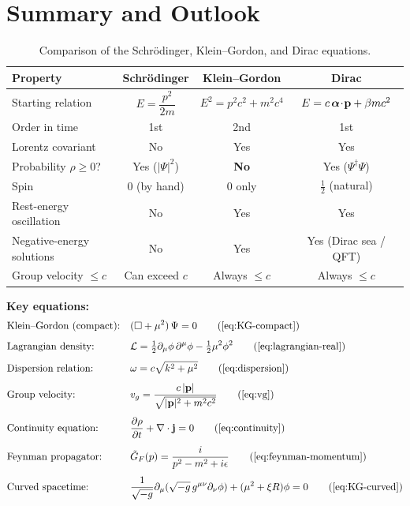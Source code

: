 \documentclass[12pt, a4paper]{article}
\theoremstyle{definition}
\begin{document}
\section{Summary and Outlook}
\label{sec:summary}

\renewcommand{\arraystretch}{1.4}
\begin{table}[h]
\centering
\caption{Comparison of the Schr\"{o}dinger, Klein--Gordon, and Dirac equations.}
\begin{tabular}{@{}lccc@{}}
\toprule
\textbf{Property}
    & \textbf{Schr\"{o}dinger}
    & \textbf{Klein--Gordon}
    & \textbf{Dirac} \\
\midrule
Starting relation
    & $E = \dfrac{p^{2}}{2m}$
    & $E^{2} = p^{2}c^{2}+m^{2}c^{4}$
    & $E = c\,\boldsymbol{\alpha}\!\cdot\!\vb{p}+\beta mc^{2}$ \\[6pt]
Order in time
    & 1st & 2nd & 1st \\
Lorentz covariant
    & No & Yes & Yes \\
Probability $\rho\geq 0$?
    & Yes ($|\Psi|^{2}$)
    & \textbf{No}
    & Yes ($\Psi^{\dagger}\Psi$) \\
Spin
    & 0 (by hand)
    & 0 only
    & $\tfrac{1}{2}$ (natural) \\
Rest-energy oscillation
    & No & Yes & Yes \\
Negative-energy solutions
    & No & Yes & Yes (Dirac sea / QFT) \\
Group velocity $\leq c$
    & Can exceed $c$ & Always $\leq c$ & Always $\leq c$ \\
\bottomrule
\end{tabular}
\end{table}

\noindent\textbf{Key equations:}
\begin{align}
    &\text{Klein--Gordon (compact):}
    &&(\Box + \mu^{2})\,\Psi = 0
    \tag{\ref{eq:KG-compact}} \\[4pt]
    &\text{Lagrangian density:}
    &&\mathcal{L} = \tfrac{1}{2}\partial_{\mu}\phi\,\partial^{\mu}\phi
      - \tfrac{1}{2}\mu^{2}\phi^{2}
    \tag{\ref{eq:lagrangian-real}} \\[4pt]
    &\text{Dispersion relation:}
    &&\omega = c\sqrt{k^{2}+\mu^{2}}
    \tag{\ref{eq:dispersion}} \\[4pt]
    &\text{Group velocity:}
    &&v_{g} = \frac{c\,|\vb{p}|}{\sqrt{|\vb{p}|^{2}+m^{2}c^{2}}}
    \tag{\ref{eq:vg}} \\[4pt]
    &\text{Continuity equation:}
    &&\frac{\partial\rho}{\partial t}+\nabla\cdot\vb{j}=0
    \tag{\ref{eq:continuity}} \\[4pt]
    &\text{Feynman propagator:}
    &&\tilde{G}_{F}(p) = \frac{i}{p^{2}-m^{2}+i\epsilon}
    \tag{\ref{eq:feynman-momentum}} \\[4pt]
    &\text{Curved spacetime:}
    &&\frac{1}{\sqrt{-g}}\partial_{\mu}(\sqrt{-g}\,g^{\mu\nu}\partial_{\nu}\phi)
      +(\mu^{2}+\xi R)\phi=0
    \tag{\ref{eq:KG-curved}}
\end{align}
\end{document}

